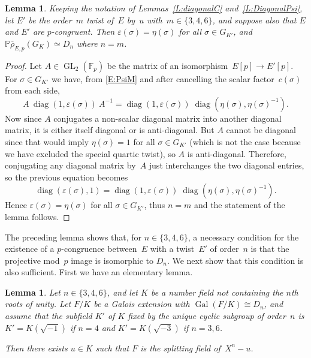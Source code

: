 \documentclass[12pt, reqno]{amsart}
\newcommand{\Fp}{\mathbb{F}_p}
\newcommand{\PP}{\mathbb{P}}
\newcommand{\rhobar}{{\overline{\rho}}}
\newcommand{\eps}{\varepsilon}
\DeclareMathOperator{\Gal}{Gal}
\newcommand{\GL}{\operatorname{GL}}
\newcommand{\diag}{{\operatorname{diag}}}
\numberwithin{equation}{section}
\newtheorem{lemma}[theorem]{Lemma}
\theoremstyle{definition}
\theoremstyle{remark}
\begin{document}
\begin{lemma}\label{L:EpsEta}
  Keeping the notation of Lemmas~\ref{L:diagonalC}
  and~\ref{L:DiagonalPsi}, let $E'$ be the order~$m$ twist of~$E$
  by~$u$ with~$m \in \{3,4,6\}$, and suppose also that $E$ and $E'$
  are $p$-congruent.  Then $\eps(\sigma)=\eta(\sigma)$ for all
  $\sigma\in G_{K'}$, and $\PP \rhobar_{E,p}(G_K) \simeq D_n$ where
  $n=m$.
\end{lemma}
\begin{proof}
  Let $A\in\GL_2(\Fp)$ be the matrix of an isomorphism~$E[p]\to
  E'[p]$.  For $\sigma\in G_{K'}$ we have, from \eqref{E:PsiM} and
  after cancelling the scalar factor~$c(\sigma)$ from each side,
\[
A\ \diag(1,\eps(\sigma))\ A^{-1} = \diag(1,\eps(\sigma))\; \diag(\eta(\sigma),\eta(\sigma)^{-1}).
\]
Now since $A$ conjugates a non-scalar diagonal matrix into another
diagonal matrix, it is either itself diagonal or is anti-diagonal.
But $A$ cannot be diagonal since that would imply $\eta(\sigma)=1$ for
all $\sigma\in G_{K'}$ (which is not the case because we have excluded the special quartic twist), so $A$ is anti-diagonal.  Therefore, conjugating any
diagonal matrix by~$A$ just interchanges the two diagonal entries, so
the previous equation becomes
\[
\diag(\eps(\sigma),1) = \diag(1,\eps(\sigma))\; \diag(\eta(\sigma),\eta(\sigma)^{-1}).
\]
Hence $\eps(\sigma)=\eta(\sigma)$ for all $\sigma\in G_{K'}$, thus $n=m$ and the
statement of the lemma follows.
\end{proof}

The preceding lemma shows that, for $n\in\{3,4,6\}$, a necessary
condition for the existence of a $p$-congruence between~$E$ with a
twist~$E'$ of order~$n$ is that the projective mod~$p$ image is
isomorphic to $D_n$.  We next show that this condition is also
sufficient.  First we have an elementary lemma.

\begin{lemma}
Let $n\in\{3,4,6\}$, and let $K$ be a number field not containing the
$n$th roots of unity.  Let $F/K$ be a Galois extension with
$\Gal(F/K)\cong D_n$, and assume that the subfield $K'$ of $K$ fixed
by the unique cyclic subgroup of order~$n$ is $K'=K(\sqrt{-1})$ if
$n=4$ and $K'=K(\sqrt{-3})$ if $n=3,6$.

Then there exists $u\in K$ such that $F$ is the splitting field of~$X^n-u$.
\end{lemma}

\def\rnu{\root n\of u} \def\rnub{\root n\of {\overline{u}}}
\end{document}
